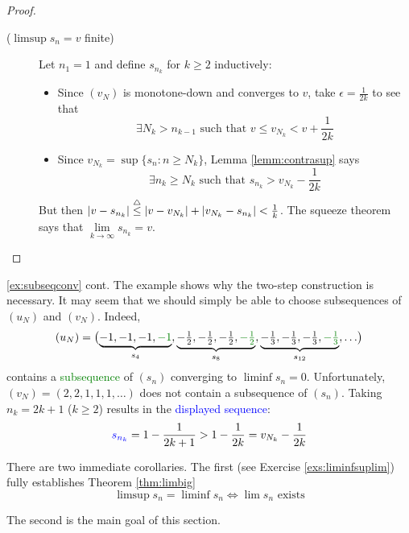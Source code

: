 \begin{proof}
\begin{description}
	  \item[\normalfont ($\limsup s_n=v$ finite)]\lstsp Let $n_1=1$ and define $s_{n_k}$ for $k\ge 2$ inductively:
		\begin{itemize}
		  \item Since $(v_N)$ is monotone-down and converges to $v$, take $\epsilon=\frac 1{2k}$ to see that\footnotemark{}
		  \[
		  	\exists N_k> n_{k-1}\text{ such that }v\le v_{N_k}<v+\frac 1{2k}
		  \]
	
		  \item Since $v_{N_k}=\sup\{s_n:n\ge N_k\}$, Lemma \ref{lemm:contrasup} says
		  \[
		  	\exists n_k\ge N_k\text{ such that }s_{n_k}>v_{N_k}-\frac 1{2k}
		  \]
		\end{itemize}
		But then $\left| v-s_{n_k}\right|\overset{\smash{\triangle}}{\le}\left| v-v_{N_k}\right|+\left| v_{N_k}-s_{n_k}\right|<\frac 1k$. The squeeze theorem says that $\lim\limits_{k\to\infty}s_{n_k}=v$.\hfill\qedhere
	\end{description}
\end{proof}



\goodbreak


\begin{example*}{\ref{ex:subseqconv} cont.}{}
	The example shows why the two-step construction is necessary. It may seem that we should simply be able to choose subsequences of $(u_N)$ and $(v_N)$. Indeed,
	\[
		(u_N)=\bigl(
		\underbrace{-1,-1,-1,\textcolor{Green}{-1}}_{s_4}, 
		\underbrace{-\tfrac 12,-\tfrac 12,-\tfrac 12,\textcolor{Green}{-\tfrac 12}}_{s_8}, 
		\underbrace{-\tfrac 13,-\tfrac 13,-\tfrac 13,\textcolor{Green}{-\tfrac 13}}_{s_{12}},
		\ldots\bigr)
	\]
	contains a \textcolor{Green}{subsequence} of $(s_n)$ converging to $\liminf s_n=0$. Unfortunately, $(v_N)=(2,2,1,1,1,\ldots)$ does not contain a subsequence of $(s_n)$. Taking $n_k=2k+1$ ($k\ge 2$) results in the \textcolor{blue}{displayed sequence}:
	\[
		\textcolor{blue}{s_{n_k}}=1-\frac 1{2k+1}>1-\frac 1{2k} =v_{N_k}-\frac 1{2k}
	\]
\end{example*}


There are two immediate corollaries. The first (see Exercise \ref{exs:liminfsuplim}) fully establishes Theorem \ref{thm:limbig}
\[
	\limsup s_n=\liminf s_n \iff \lim s_n\text{ exists} \tag{could be $\pm\infty$}
\]


The second is the main goal of this section.

